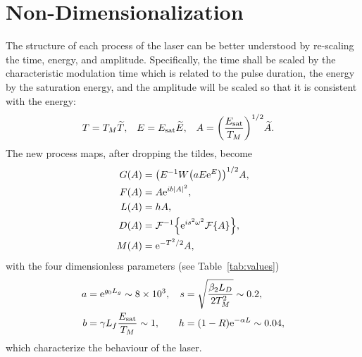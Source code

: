 

\section{Non-Dimensionalization}

%
%
%

The structure of each process of the laser can be better understood by re-scaling the time, energy, and amplitude. Specifically, the time shall be scaled by the characteristic modulation time which is related to the pulse duration, the energy by the saturation energy, and the amplitude will be scaled so that it is consistent with the energy:
\begin{align*}
	T &= T_M \widetilde{T},& E &= \Es \widetilde{E},& A &= \left( \frac{\Es}{T_M} \right)^{1/2} \widetilde{A}.
\end{align*}
The new process maps, after dropping the tildes, become
\begin{subequations}
\label{eq:effects}
\begin{align}
\label{eq:gain}
G(A) &= \left(E^{-1} W \left( a E \textrm{e}^{E}\right) \right)^{1/2} A, \\
\label{eq:fibre}
F(A) &= A \textrm{e}^{i b |A|^2}, \\
\label{eq:loss}
L(A) &= h A, \\
\label{eq:disp}
D(A) &= \FTi{\textrm{e}^{i s^2 \omega^2} \FT{A}}, \\
\label{eq:mod}
M(A) &= \textrm{e}^{-T^2 / 2} A,
\end{align}
\end{subequations}
with the four dimensionless parameters (see Table~\ref{tab:values})
\begin{align*}
	a &= \textrm{e}^{g_0 L_g} \sim 8 \times 10^3,& s &= \sqrt{\frac{\beta_2 L_D}{2 T_M^2}} \sim 0.2, \\
	b &= \gamma L_f \frac{E_{\textrm{sat}}}{T_M} \sim 1,& h &= (1 - R) \textrm{e}^{-\alpha L} \sim 0.04,
\end{align*}
which characterize the behaviour of the laser.

